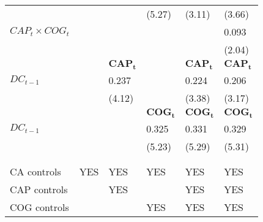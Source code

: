 \documentclass[review,fleqn]{elsarticle}\usepackage[]{graphicx}\usepackage[]{color}
\begin{document}
\begin{table}[t]
\begin{tabular}{l*{5}{l}}
                           &                            &                               & (5.27)     & (3.11)  & (3.66)       \\ [1em]
    $CAP_{t} \times COG_t$ &                            &                               &                               &                            & 0.093                  \\
                           &                            &                               &                               &                            & (2.04)       \\ [1em]
    \rowcolor{Gray}
                           & $\mathbf{}$                & $\mathbf{CAP_t}$              & $\mathbf{}$                   & $\mathbf{CAP_t}$           & $\mathbf{CAP_t}$                 \\
  $DC_{t-1}$               &                            & 0.237                &                               & 0.224             & 0.206                  \\ 
                           &                            & (4.12)     &                               & (3.38)  & (3.17)       \\[1em]
    \rowcolor{Gray}
                           & $\mathbf{}$                & $\mathbf{}$                   & $\mathbf{COG_t}$              & $\mathbf{COG_t}$           & $\mathbf{COG_t}$                 \\
  $DC_{t-1}$               &                            &                               & 0.325                & 0.331             & 0.329                  \\
                           &                            &                               & (5.23)    & (5.29) & (5.31)       \\  \\[-0.5em]
  \hline                                                                                                                                                                                \\[-0.5em]
  CA controls              & YES                        & YES                           & YES                           & YES                        & YES                              \\
  CAP controls             &                            & YES                           &                               & YES                        & YES                              \\
  COG controls             &                            &                               & YES                           & YES                        & YES                              \\

\end{tabular}
\end{table}
\end{document}
